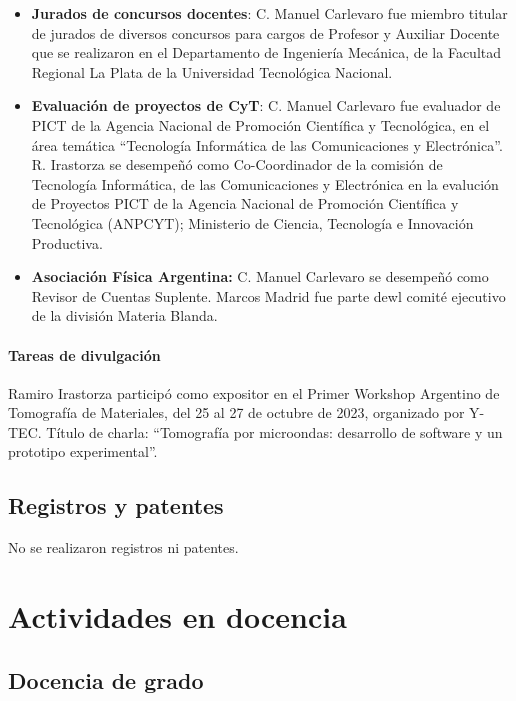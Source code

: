 \documentclass[a4paper,11pt,twoside,final,titlepage,onecolumn,openright]{report}
\begin{document}
\begin{itemize}
\item \textbf{Jurados de concursos docentes}: C. Manuel Carlevaro fue miembro titular de jurados de diversos concursos para cargos de Profesor y Auxiliar Docente que se realizaron en el Departamento de Ingeniería Mecánica, de la Facultad Regional La Plata de la Universidad Tecnológica Nacional.

\item \textbf{Evaluación de proyectos de CyT}: C. Manuel Carlevaro fue evaluador de PICT de la Agencia Nacional de Promoción Científica y Tecnológica, en el área temática ``Tecnología Informática de las Comunicaciones y Electrónica''. R. Irastorza se desempeñó como Co-Coordinador de la comisión de Tecnología Informática, de las Comunicaciones y Electrónica en la evalución de Proyectos PICT de la Agencia Nacional de Promoción Científica y Tecnológica (ANPCYT); Ministerio de Ciencia, Tecnología e Innovación Productiva. 
 
\item \textbf{Asociación Física Argentina:} C. Manuel Carlevaro se desempeñó como Revisor de Cuentas Suplente. Marcos Madrid fue parte dewl comité ejecutivo de la división Materia Blanda.
 
\end{itemize}




\subsubsection{Tareas de divulgación}

Ramiro Irastorza participó como expositor en el Primer Workshop Argentino de Tomografía de Materiales, del 25 al 27 de octubre de 2023, organizado por Y-TEC. Título de charla: ``Tomografía por microondas: desarrollo de software y un prototipo experimental''.

\section{Registros y patentes}

No se realizaron registros ni patentes.



\chapter{Actividades en docencia}

\section{Docencia de grado}
\end{document}
